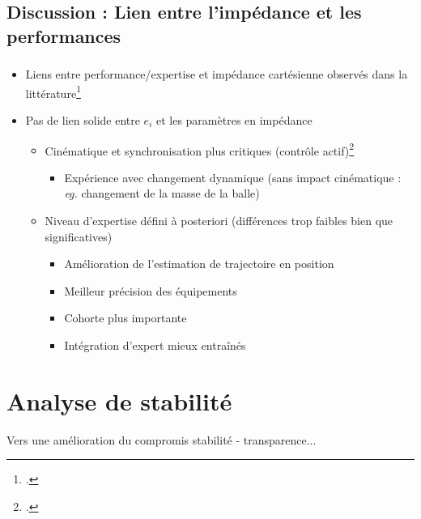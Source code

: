 \documentclass[10pt,xcolor=table]{beamer}
\begin{document}
\subsection{Discussion : Lien entre l'impédance et les performances}
\begin{frame}
	\frametitle{\insertsubsection}
	\begin{itemize}[<+->]
		\item Liens entre performance/expertise et impédance cartésienne observés dans la littérature\footcite{erden_end-point_2015,burdet_central_2001}
		\item Pas de lien solide entre $e_i$ et les paramètres en impédance
		\begin{itemize}
			\item[$\Rightarrow$] Cinématique et synchronisation plus critiques (contrôle actif)\footcite{morice_learning_2007,de_rugy_actively_2003}
			\begin{itemize}
				\item Expérience avec changement dynamique (sans impact cinématique : \textit{eg.} changement de la masse de la balle)
			\end{itemize}
			\item[$\Rightarrow$] Niveau d'expertise défini à posteriori (différences trop faibles bien que significatives)
			\begin{itemize}
				\item Amélioration de l'estimation de trajectoire en position
				\item Meilleur précision des équipements
				\item Cohorte plus importante
				\item Intégration d'expert mieux entraînés
			\end{itemize}
		\end{itemize}
	\end{itemize}
\end{frame}

\section{Analyse de stabilité}

{
	\begin{frame}
	\vspace{-1em}
	\begin{block}{\centering\insertsection}
		Vers une amélioration du compromis stabilité - transparence...
	\end{block}
\end{frame}
}
\end{document}
